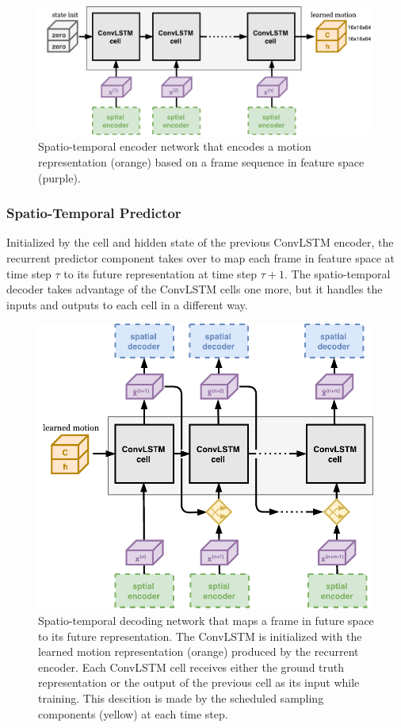 \begin{figure}[htb]
	\centering
	\includegraphics[width=0.8\linewidth]{figures/comp_spatiotemp_encoder.pdf} 
	\caption[Spatio-Temporal Encoding Component]{Spatio-temporal encoder network that encodes a motion representation (orange) based on a frame sequence in feature space (purple).} \label{fig:comp-spatiotemp_encoder}
\end{figure}

\subsubsection{Spatio-Temporal Predictor}

Initialized by the cell and hidden state of the previous ConvLSTM encoder, the recurrent predictor component takes over to map each frame in feature space at time step $\tau$ to its future representation at time step $\tau + 1$. The spatio-temporal decoder takes advantage of the ConvLSTM cells one more, but it handles the inputs and outputs to each cell in a different way.

\begin{figure}[htb]
	\centering
	\includegraphics[width=0.7\linewidth]{figures/comp_spatiotemp_decoder.pdf} 
	\caption[Spatio-Temporal Predictor Component]{Spatio-temporal decoding network that maps a frame in future space to its future representation. The ConvLSTM is initialized with the learned motion representation (orange) produced by the recurrent encoder. Each ConvLSTM cell receives either the ground truth representation or the output of the previous cell as its input while training. This descition is made by the scheduled sampling components (yellow) at each time step.} \label{fig:comp-spatiotemp_predictor}
\end{figure}

